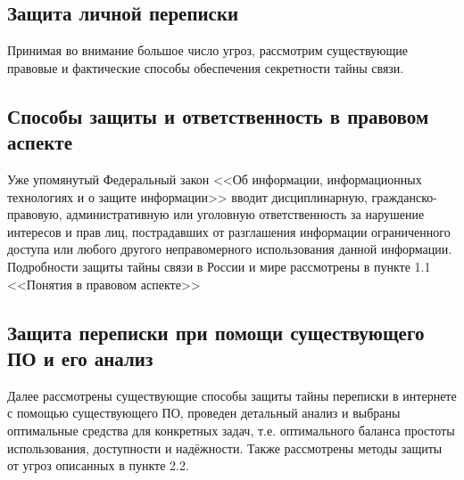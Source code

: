 \parindent=1cm %
\begin{center}
		
		\section{Защита личной переписки}
		
\end{center}

Принимая во внимание большое число угроз, рассмотрим существующие правовые и фактические способы обеспечения секретности тайны связи.
\subsection{Способы защиты и ответственность в правовом аспекте}

Уже упомянутый Федеральный закон <<Об информации, информационных технологиях и о защите информации>>   вводит дисциплинарную, гражданско-правовую, административную или уголовную ответственность за   нарушение интересов и прав лиц, пострадавших от разглашения информации ограниченного доступа или любого другого неправомерного использования данной информации.   Подробности защиты тайны связи в России и мире рассмотрены в пункте 1.1 <<Понятия в правовом аспекте>>
\subsection{Защита переписки при помощи существующего ПО и его анализ}
Далее  рассмотрены существующие способы защиты тайны переписки в интернете с помощью существующего ПО, проведен детальный анализ и выбраны оптимальные средства для конкретных задач, т.е. оптимального баланса простоты использования, доступности и надёжности. Также рассмотрены методы защиты от угроз описанных  в пункте 2.2. 
\\


